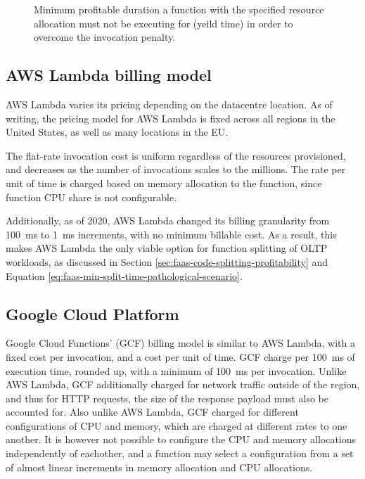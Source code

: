 \begin{figure*}[t]
    \begin{center}
        
    \end{center}
    \caption{Minimum profitable duration a \faas{} function with the specified resource allocation must not be executing for (yeild time) in order to overcome the invocation penalty.}
\end{figure*}

\subsection{AWS Lambda billing model}
AWS Lambda varies its pricing depending on the datacentre location. As of writing, the pricing model for AWS Lambda is fixed across all regions in the United States, as well as many locations in the EU\cite{ServerlessComputingAWS}.

The flat-rate invocation cost is uniform regardless of the resources provisioned, and decreases as the number of invocations scales to the millions. The rate per unit of time is charged based on memory allocation to the function, since function CPU share is not configurable.

Additionally, as of 2020, AWS Lambda changed its billing granularity from \SI{100}{\milli\second} to \SI{1}{\milli\second}\cite{AWSLambdaChanges} increments, with no minimum billable cost. As a result, this makes AWS Lambda the only viable option for function splitting of OLTP workloads, as discussed in Section \ref{sec:faas-code-splitting-profitability} and Equation \ref{eq:faas-min-split-time-pathological-scenario}.

\subsection{Google Cloud Platform}
Google Cloud Functions' (GCF) billing model is similar to AWS Lambda, with a fixed cost per invocation, and a cost per unit of time. GCF charge per \SI{100}{\milli\second} of execution time, rounded up, with a minimum of \SI{100}{\milli\second} per invocation\cite{PricingCloudFunctions}. Unlike AWS Lambda, GCF additionally charged for network traffic outside of the region, and thus for HTTP requests, the size of the response payload must also be accounted for. Also unlike AWS Lambda, GCF charged for different configurations of CPU and memory, which are charged at different rates to one another. It is however not possible to configure the CPU and memory allocations independently of eachother, and a function may select a configuration from a set of almost linear increments in memory allocation and CPU allocations.

